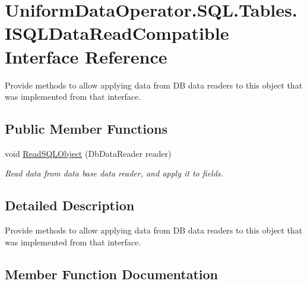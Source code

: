\hypertarget{interface_uniform_data_operator_1_1_s_q_l_1_1_tables_1_1_i_s_q_l_data_read_compatible}{}\section{Uniform\+Data\+Operator.\+S\+Q\+L.\+Tables.\+I\+S\+Q\+L\+Data\+Read\+Compatible Interface Reference}
\label{interface_uniform_data_operator_1_1_s_q_l_1_1_tables_1_1_i_s_q_l_data_read_compatible}


Provide methods to allow applying data from DB data readers to this object that was implemented from that interface.  


\subsection*{Public Member Functions}
\begin{DoxyCompactItemize}
\item 
void \mbox{\hyperlink{interface_uniform_data_operator_1_1_s_q_l_1_1_tables_1_1_i_s_q_l_data_read_compatible_ae3ee33fbd62885e08138cc3d26215893}{Read\+S\+Q\+L\+Object}} (Db\+Data\+Reader reader)
\begin{DoxyCompactList}\small\item\em Read data from data base data reader, and apply it to fields. \end{DoxyCompactList}\end{DoxyCompactItemize}


\subsection{Detailed Description}
Provide methods to allow applying data from DB data readers to this object that was implemented from that interface. 



\subsection{Member Function Documentation}
\mbox{\label{interface_uniform_data_operator_1_1_s_q_l_1_1_tables_1_1_i_s_q_l_data_read_compatible_ae3ee33fbd62885e08138cc3d26215893}} 
